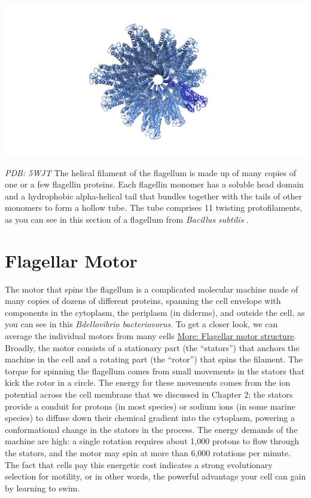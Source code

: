 \documentclass[]{tufte-book}
\begin{document}
\includegraphics{img/schematics/6_1_1}

\emph{PDB: 5WJT} The helical filament of the flagellum is made up of
many copies of one or a few flagellin proteins. Each flagellin monomer
has a soluble head domain and a hydrophobic alpha-helical tail that
bundles together with the tails of other monomers to form a hollow tube.
The tube comprises 11 twisting protofilaments, as you can see in this
section of a flagellum from \emph{Bacillus subtilis} \citep{wang2017}.

\section{Flagellar Motor}\label{flagellar-motor}

The motor that spins the flagellum is a complicated molecular machine
made of many copies of dozens of different proteins, spanning the cell
envelope with components in the cytoplasm, the periplasm (in diderms),
and outside the cell, as you can see in this \emph{Bdellovibrio
bacteriovorus}. To get a closer look, we can average the individual
motors from many cells
\protect\hyperlink{Flagellar_motor_structure}{More: Flagellar motor
structure}. Broadly, the motor consists of a stationary part (the
``stators'') that anchors the machine in the cell and a rotating part
(the ``rotor'') that spins the filament. The torque for spinning the
flagellum comes from small movements in the stators that kick the rotor
in a circle. The energy for these movements comes from the ion potential
across the cell membrane that we discussed in Chapter 2; the stators
provide a conduit for protons (in most species) or sodium ions (in some
marine species) to diffuse down their chemical gradient into the
cytoplasm, powering a conformational change in the stators in the
process. The energy demands of the machine are high: a single rotation
requires about 1,000 protons to flow through the stators, and the motor
may spin at more than 6,000 rotations per minute. The fact that cells
pay this energetic cost indicates a strong evolutionary selection for
motility, or in other words, the powerful advantage your cell can gain
by learning to swim.
\end{document}
